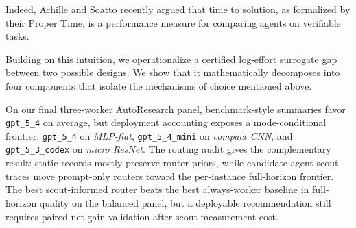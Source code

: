 \documentclass{article}
\begin{document}
Indeed, Achille and Soatto \citep{achille2025agents} recently argued that time to solution, as formalized by their Proper Time, is a performance measure for comparing agents on verifiable tasks.

Building on this intuition, we operationalize a certified log-effort surrogate gap between two possible designs. We show that it mathematically decomposes into four components that isolate the mechanisms of choice mentioned above.

On our final three-worker AutoResearch panel, benchmark-style summaries favor \texttt{gpt\_5\_4} on average, but deployment accounting exposes a mode-conditional frontier: \texttt{gpt\_5\_4} on \textit{MLP-flat}, \texttt{gpt\_5\_4\_mini} on \textit{compact CNN}, and \texttt{gpt\_5\_3\_codex} on \textit{micro ResNet}.
The routing audit gives the complementary result: static records mostly preserve router priors, while candidate-agent scout traces move prompt-only routers toward the per-instance full-horizon frontier.
The best scout-informed router beats the best always-worker baseline in full-horizon quality on the balanced panel, but a deployable recommendation still requires paired net-gain validation after scout measurement cost.


\end{document}
